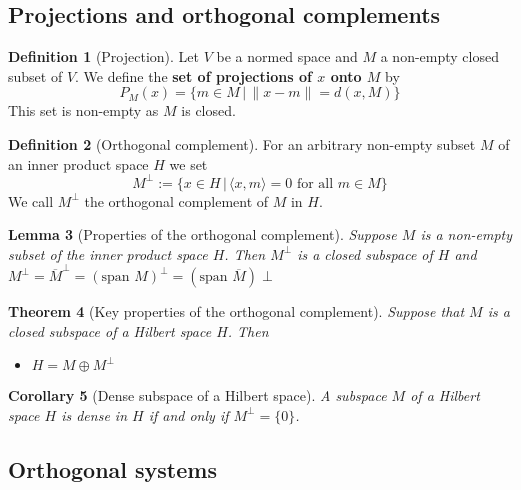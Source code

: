 \documentclass[10pt, oneside, reqno]{amsart}
\theoremstyle{plain}%
\newtheorem{thm}{Theorem}[section]
\newtheorem{lem}[thm]{Lemma}
\newtheorem{cor}[thm]{Corollary}
\theoremstyle{definition}
\newtheorem{defn}[thm]{Definition}
\theoremstyle{remark}
\newcommand{\iprod}[2]{\langle #1, #2 \rangle}
\newcommand{\ol}[1]{\overline{#1}}
\begin{document}
\subsection{Projections and orthogonal complements} %
\label{sub:projections_and_orthogonal_complements}

\begin{defn}[Projection]
    Let $V$ be a normed space and $M$ a non-empty closed subset of $V$.  We define the \textbf{set of projections of $x$ onto $M$} by \[
        P_M(x) = \{ m \in M \, | \, \|x - m \| = d(x, M) \}
    \]
    This set is non-empty as $M$ is closed.
\end{defn}
\begin{defn}[Orthogonal complement]
    For an arbitrary non-empty subset $M$ of an inner product space $H$ we set \[
        M^{\perp} := \{ x \in H \, | \, \iprod{x}{m} = 0 \text{ for all $m \in M$} \}
    \]
    We call $M^\perp$ the orthogonal complement of $M$ in $H$.
\end{defn}

\begin{lem}[Properties of the orthogonal complement]
    Suppose $M$ is a non-empty subset of the inner product space $H$.  Then $M^\perp$ is a closed subspace of $H$ and $M^\perp = \ol M^\perp = (\text{span $M$})^\perp = (\text{span $\ol M$})\perp$
\end{lem}

\begin{thm}[Key properties of the orthogonal complement]
    Suppose that $M$ is a closed subspace of a Hilbert space $H$. Then 
    \begin{itemize}
        \item $H = M \oplus M^\perp$ 
    \end{itemize}
    
    \end{thm}

\begin{cor}[Dense subspace of a Hilbert space]
    A subspace $M$ of a Hilbert space $H$ is dense in $H$ if and only if $M^\perp = \{0 \}$.
\end{cor}


\subsection{Orthogonal systems} %
\label{sub:orthogonal_systems}
\end{document}
